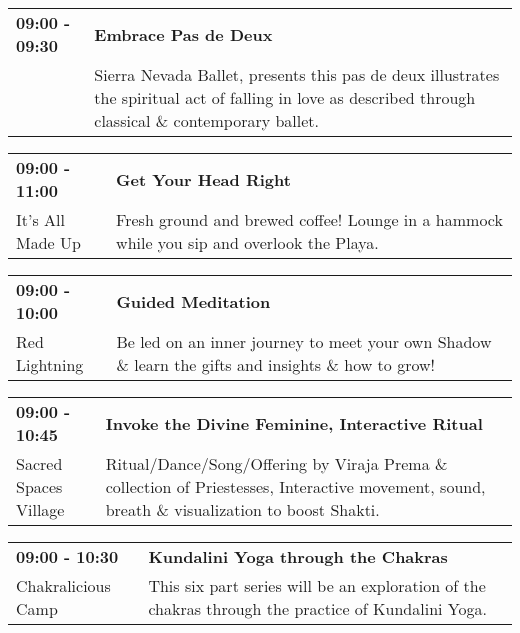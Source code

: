 \begin{tabular}{ p{1in} p{2.2in} }
    \textbf{09:00 - 09:30} & \textbf{Embrace Pas de Deux} \\
    ~ \newline  & Sierra Nevada Ballet, presents this pas de deux illustrates the spiritual act of falling in love as described through classical \& contemporary ballet. \\
    \hline 
\end{tabular}
    
\begin{tabular}{ p{1in} p{2.2in} }
    \textbf{09:00 - 11:00} & \textbf{Get Your Head Right} \\
    It's All Made Up \newline  & Fresh ground and brewed coffee! Lounge in a hammock while you sip and overlook the Playa. \\
    \hline 
\end{tabular}
    
\begin{tabular}{ p{1in} p{2.2in} }
    \textbf{09:00 - 10:00} & \textbf{Guided Meditation} \\
    Red Lightning \newline  & Be led on an inner journey to meet your own Shadow \& learn the gifts and insights \& how to grow! \\
    \hline 
\end{tabular}
    
\begin{tabular}{ p{1in} p{2.2in} }
    \textbf{09:00 - 10:45} & \textbf{Invoke the Divine Feminine, Interactive Ritual} \\
    Sacred Spaces Village \newline  & Ritual/Dance/Song/Offering by Viraja Prema \& collection of Priestesses, Interactive movement, sound, breath \& visualization to boost Shakti. \\
    \hline 
\end{tabular}
    
\begin{tabular}{ p{1in} p{2.2in} }
    \textbf{09:00 - 10:30} & \textbf{Kundalini Yoga through the Chakras} \\
    Chakralicious Camp \newline  & This six part series will be an exploration of the chakras through the practice of Kundalini Yoga. \\
    \hline 
\end{tabular}
    
